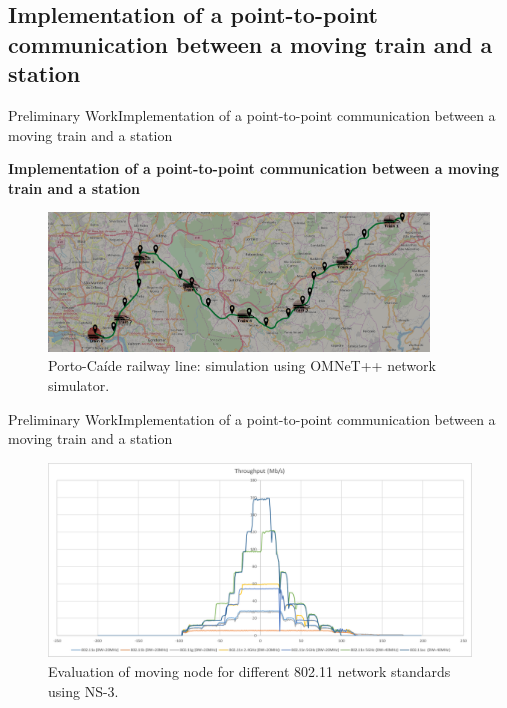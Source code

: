 \subsection{Implementation of a point-to-point communication between a moving train and a station}

\begin{frame}{Preliminary Work}{Implementation of a point-to-point communication between a moving train and a station}
\begin{block}{\textbf{Implementation of a point-to-point communication between a moving train and a station}}
	
	\begin{figure}[ht!]
		\centering
			\includegraphics[width=0.9\textwidth,keepaspectratio]{figures/50.PreliminaryW/porto-caide2}
		\caption{Porto-Caíde railway line: simulation using OMNeT++ network simulator.}
	\end{figure}
	
\end{block}
\end{frame}

\begin{frame}{Preliminary Work}{Implementation of a point-to-point communication between a moving train and a station}

\begin{figure}[ht!]
	\centering
	\includegraphics[width=\textwidth,keepaspectratio]{figures/50.PreliminaryW/distance-rate}
	\caption{Evaluation of moving node for different 802.11 network standards using NS-3.}
\end{figure}


\end{frame}

